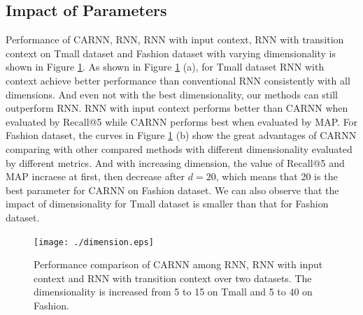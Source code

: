 \documentclass[conference]{IEEEtran}
\begin{document}
\subsection{Impact of Parameters}

Performance of CARNN, RNN, RNN with input context, RNN with transition context on Tmall dataset and Fashion dataset with varying dimensionality is shown in Figure \ref{fig:dimension}. As shown in Figure \ref{fig:dimension} (a), for Tmall dataset RNN with context achieve better performance than conventional RNN consistently with all dimensions. And even not with the best dimensionality, our methods can still outperform RNN. RNN with input context performs better than CARNN when evaluated by Recall@5 while CARNN performs best when evaluated by MAP. For Fashion dataset, the curves in Figure \ref{fig:dimension} (b) show the great advantages of CARNN comparing with other compared methods with different dimensionality evaluated by different metrics. And with increasing dimension, the value of Recall@5 and MAP incraese at first, then decrease after $d = 20$, which means that 20 is the best parameter for CARNN on Fashion dataset. We can also observe that the impact of dimensionality for Tmall dataset is smaller than that for Fashion dataset.


\begin{figure}[!tb]
\centering
{
\begin{minipage}[b]{0.5\textwidth}
\texttt{[image: ./dimension.eps]}
\label{dimension}
\end{minipage}
}

\caption{Performance comparison of CARNN among RNN, RNN with input context and RNN with transition context over two datasets. The dimensionality is increased from 5 to 15 on Tmall and 5 to 40 on Fashion.}
\label{fig:dimension}
\end{figure}
\end{document}
